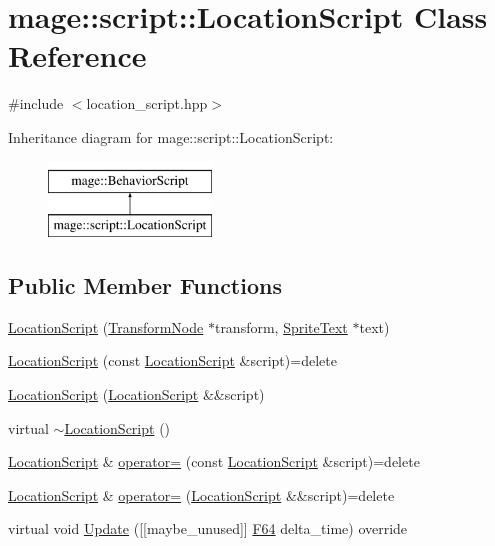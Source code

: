 \hypertarget{classmage_1_1script_1_1_location_script}{}\section{mage\+:\+:script\+:\+:Location\+Script Class Reference}
\label{classmage_1_1script_1_1_location_script}


{\ttfamily \#include $<$location\+\_\+script.\+hpp$>$}

Inheritance diagram for mage\+:\+:script\+:\+:Location\+Script\+:\begin{figure}[H]
\begin{center}
\leavevmode
\includegraphics[height=2.000000cm]{classmage_1_1script_1_1_location_script}
\end{center}
\end{figure}
\subsection*{Public Member Functions}
\begin{DoxyCompactItemize}
\item 
\hyperlink{classmage_1_1script_1_1_location_script_a50b18f8158e33831907e7299bff9e499}{Location\+Script} (\hyperlink{classmage_1_1_transform_node}{Transform\+Node} $\ast$transform, \hyperlink{classmage_1_1_sprite_text}{Sprite\+Text} $\ast$text)
\item 
\hyperlink{classmage_1_1script_1_1_location_script_a66168c494360caf2b9e6363c47f8f15d}{Location\+Script} (const \hyperlink{classmage_1_1script_1_1_location_script}{Location\+Script} \&script)=delete
\item 
\hyperlink{classmage_1_1script_1_1_location_script_aa8438383d00de95deb585ac7d7349dfb}{Location\+Script} (\hyperlink{classmage_1_1script_1_1_location_script}{Location\+Script} \&\&script)
\item 
virtual \hyperlink{classmage_1_1script_1_1_location_script_aa75c1d8f101670ff8be77595a9c073bb}{$\sim$\+Location\+Script} ()
\item 
\hyperlink{classmage_1_1script_1_1_location_script}{Location\+Script} \& \hyperlink{classmage_1_1script_1_1_location_script_a089b534e23f8c60586b9700c33f9bc9f}{operator=} (const \hyperlink{classmage_1_1script_1_1_location_script}{Location\+Script} \&script)=delete
\item 
\hyperlink{classmage_1_1script_1_1_location_script}{Location\+Script} \& \hyperlink{classmage_1_1script_1_1_location_script_a51f836eb7c96e433d28708bab47c4b48}{operator=} (\hyperlink{classmage_1_1script_1_1_location_script}{Location\+Script} \&\&script)=delete
\item 
virtual void \hyperlink{classmage_1_1script_1_1_location_script_a039dc17396f2914e1ca043d8384b62da}{Update} (\mbox{[}\mbox{[}maybe\+\_\+unused\mbox{]}\mbox{]} \hyperlink{namespacemage_ad26233bbec640deda836e572c1a23708}{F64} delta\+\_\+time) override
\end{DoxyCompactItemize}
